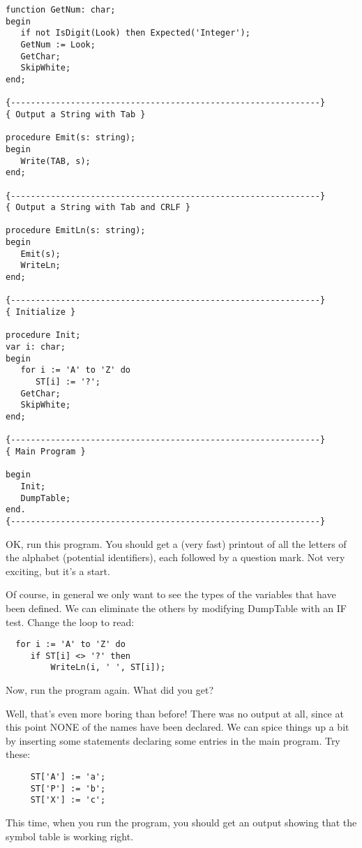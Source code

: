 \begin{verbatim}
function GetNum: char;
begin
   if not IsDigit(Look) then Expected('Integer');
   GetNum := Look;
   GetChar;
   SkipWhite;
end;

{--------------------------------------------------------------}
{ Output a String with Tab }

procedure Emit(s: string);
begin
   Write(TAB, s);
end;

{--------------------------------------------------------------}
{ Output a String with Tab and CRLF }

procedure EmitLn(s: string);
begin
   Emit(s);
   WriteLn;
end;

{--------------------------------------------------------------}
{ Initialize }

procedure Init;
var i: char;
begin
   for i := 'A' to 'Z' do
      ST[i] := '?';
   GetChar;
   SkipWhite;
end;

{--------------------------------------------------------------}
{ Main Program }

begin
   Init;
   DumpTable;
end.
{--------------------------------------------------------------}
\end{verbatim}

OK, run this program. You  should  get a (very fast) printout of all the letters of  the  alphabet  (potential  identifiers), each followed by  a  question  mark. Not  very exciting, but it's a start.

Of course, in general we  only  want  to  see  the  types  of the variables that have been defined. We can eliminate the others by modifying DumpTable with an IF test. Change the loop to read:

\begin{verbatim}
  for i := 'A' to 'Z' do
     if ST[i] <> '?' then
         WriteLn(i, ' ', ST[i]);
\end{verbatim}

Now, run the program again. What did you get?

Well, that's even more  boring  than before!  There was no output at all, since at this point NONE of the names have been declared. We  can  spice  things up a  bit  by  inserting  some  statements declaring some entries in the main program. Try these:

\begin{verbatim}
     ST['A'] := 'a';
     ST['P'] := 'b';
     ST['X'] := 'c';
\end{verbatim}

This time, when  you  run  the  program, you should get an output showing that the symbol table is working right.

